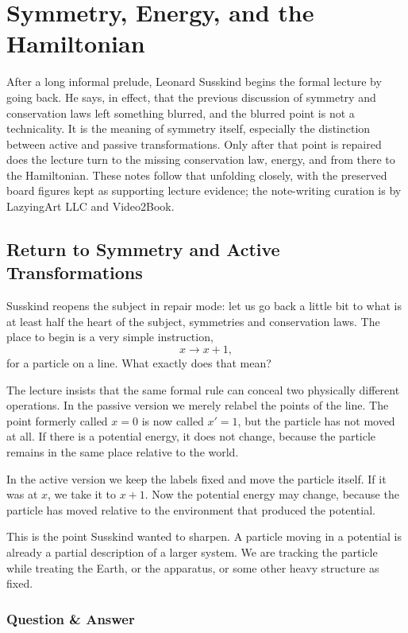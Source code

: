 \chapter{Symmetry, Energy, and the Hamiltonian}

After a long informal prelude, Leonard Susskind begins the formal lecture by going back. He says, in effect, that the previous discussion of symmetry and conservation laws left something blurred, and the blurred point is not a technicality. It is the meaning of symmetry itself, especially the distinction between active and passive transformations. Only after that point is repaired does the lecture turn to the missing conservation law, energy, and from there to the Hamiltonian. These notes follow that unfolding closely, with the preserved board figures kept as supporting lecture evidence; the note-writing curation is by LazyingArt LLC and Video2Book.

\section{Return to Symmetry and Active Transformations}

Susskind reopens the subject in repair mode: let us go back a little bit to what is at least half the heart of the subject, symmetries and conservation laws. The place to begin is a very simple instruction,
\[
x\to x+1,
\]
for a particle on a line. What exactly does that mean?

The lecture insists that the same formal rule can conceal two physically different operations. In the passive version we merely relabel the points of the line. The point formerly called \(x=0\) is now called \(x'=1\), but the particle has not moved at all. If there is a potential energy, it does not change, because the particle remains in the same place relative to the world.

In the active version we keep the labels fixed and move the particle itself. If it was at \(x\), we take it to \(x+1\). Now the potential energy may change, because the particle has moved relative to the environment that produced the potential.

This is the point Susskind wanted to sharpen. A particle moving in a potential is already a partial description of a larger system. We are tracking the particle while treating the Earth, or the apparatus, or some other heavy structure as fixed.

\subsection{Question \& Answer}

